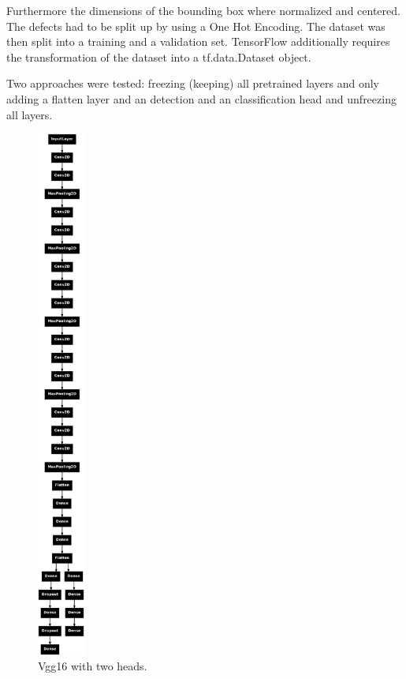 \documentclass[12pt]{article}
\begin{document}
Furthermore the dimensions of the bounding box where normalized and centered. The defects had to be split up by using a One Hot Encoding. The dataset was then split into a training and a validation set. 
TensorFlow additionally requires the transformation of the dataset into a tf.data.Dataset object.

Two approaches were tested: freezing (keeping) all pretrained layers and only adding a flatten layer and an detection and an classification head and unfreezing all layers.

\begin{figure}[h]
    \centering
    \includegraphics[width=0.14\textwidth]{./graphics/3.png}
    \caption{Vgg16 with two heads.}
\end{figure}
\end{document}
